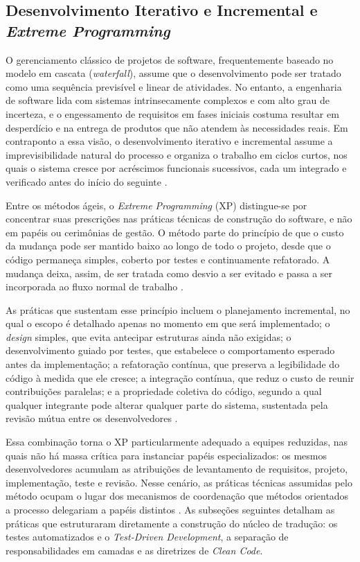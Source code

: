 \subsection{Desenvolvimento Iterativo e Incremental e \textit{Extreme Programming}}
\label{subsec:xp}

O gerenciamento clássico de projetos de software, frequentemente baseado no modelo em cascata (\textit{waterfall}), assume que o desenvolvimento pode ser tratado como uma sequência previsível e linear de atividades. No entanto, a engenharia de software lida com sistemas intrinsecamente complexos e com alto grau de incerteza, e o engessamento de requisitos em fases iniciais costuma resultar em desperdício e na entrega de produtos que não atendem às necessidades reais. Em contraponto a essa visão, o desenvolvimento iterativo e incremental assume a imprevisibilidade natural do processo e organiza o trabalho em ciclos curtos, nos quais o sistema cresce por acréscimos funcionais sucessivos, cada um integrado e verificado antes do início do seguinte \cite{pressman2016,sommerville2018}.

Entre os métodos ágeis, o \textit{Extreme Programming} (XP) distingue-se por concentrar suas prescrições nas práticas técnicas de construção do software, e não em papéis ou cerimônias de gestão. O método parte do princípio de que o custo da mudança pode ser mantido baixo ao longo de todo o projeto, desde que o código permaneça simples, coberto por testes e continuamente refatorado. A mudança deixa, assim, de ser tratada como desvio a ser evitado e passa a ser incorporada ao fluxo normal de trabalho \cite{agile2012,beck2004,wildt2015}.

As práticas que sustentam esse princípio incluem o planejamento incremental, no qual o escopo é detalhado apenas no momento em que será implementado; o \textit{design} simples, que evita antecipar estruturas ainda não exigidas; o desenvolvimento guiado por testes, que estabelece o comportamento esperado antes da implementação; a refatoração contínua, que preserva a legibilidade do código à medida que ele cresce; a integração contínua, que reduz o custo de reunir contribuições paralelas; e a propriedade coletiva do código, segundo a qual qualquer integrante pode alterar qualquer parte do sistema, sustentada pela revisão mútua entre os desenvolvedores \cite{beck2004,wildt2015}.

Essa combinação torna o XP particularmente adequado a equipes reduzidas, nas quais não há massa crítica para instanciar papéis especializados: os mesmos desenvolvedores acumulam as atribuições de levantamento de requisitos, projeto, implementação, teste e revisão. Nesse cenário, as práticas técnicas assumidas pelo método ocupam o lugar dos mecanismos de coordenação que métodos orientados a processo delegariam a papéis distintos \cite{wildt2015}. As subseções seguintes detalham as práticas que estruturaram diretamente a construção do núcleo de tradução: os testes automatizados e o \textit{Test-Driven Development}, a separação de responsabilidades em camadas e as diretrizes de \textit{Clean Code}.


